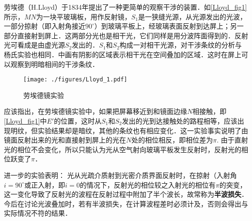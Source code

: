 
劳埃德（H.Lloyd）于1834年提出了一种更简单的观察干涉的装置．如\autoref{Lloyd_fig1}所示，$MN $为一块平玻璃板，用作反射镜，$S_1$是一狭缝光源，从光源发出的光波，一部分掠射（即入射角接近$90^\circ$）到玻璃平板上，经玻璃表面反射到达屏上；另一部分直接射到屏上．这两部分光也是相干光，它们同样是用分波阵面得到的．反射光可看成是由虚光源$S_2 $发出的．$S_1$和$S_2 $构成一对相干光源，对干涉条纹的分析与杨氏实验也相同．中画有阴影的区域表示相干光在空间叠加的区域．这时在屏上可以观察到明暗相间的干涉条纹．
\begin{figure}[ht]
\centering
\texttt{[image: ./figures/Lloyd\_1.pdf]}
\caption{劳埃德镜实验} \label{Lloyd_fig1}
\end{figure}
应该指出，在劳埃德镜实验中，如果把屏幕移近到和镜面边缘$N $相接触，即\autoref{Lloyd_fig1}中$E' $的位置，这时从$S_1$和$S_2$发出的光到达接触处的路程相等，应该出现明纹，但实验结果却是暗纹，其他的条纹也有相应变化．这一实验事实说明了由镜面反射出来的光和直接射到屏上的光在$N $处的相位相反，即相位差为$\pi$. 由于直射光的相位不会变化，所以只能认为光从空气射向玻璃平板发生反射时，反射光的相位跃变了$\pi$．

进一步的实验表明： 光从光疏介质射到光密介质界面反射时，在掠射（入射角$i=90^\circ$或正入射，即$i = 0$的情况下，反射光的相位较之入射光的相位有$\pi$的突变，这一变化导致了反射光的波程在反射过程中附加了半个波长，故常称为\textbf{半波损失}．今后在讨论光波叠加时，若有半波损失，在计算波程差时必须计及，否则会得出与实际情况不符的结果．